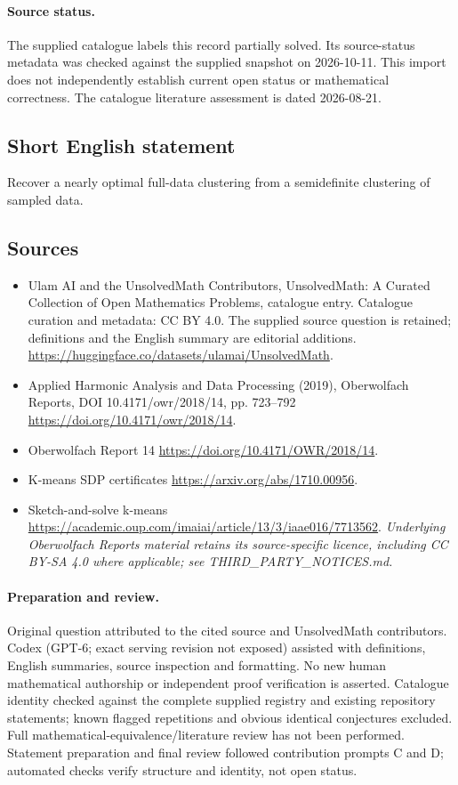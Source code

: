 \documentclass[11pt]{article}
\begin{document}
\paragraph{Source status.}
The supplied catalogue labels this record partially solved. Its source-status metadata was checked against the supplied snapshot on 2026-10-11. This import does not independently establish current open status or mathematical correctness. The catalogue literature assessment is dated 2026-08-21.
\subsection{Short English statement}
Recover a nearly optimal full-data clustering from a semidefinite clustering of sampled data.
\subsection{Sources}
\begin{itemize}
\item[S1] Ulam AI and the UnsolvedMath Contributors, UnsolvedMath: A Curated Collection of Open Mathematics Problems, catalogue entry. Catalogue curation and metadata: CC BY 4.0. The supplied source question is retained; definitions and the English summary are editorial additions.
\url{https://huggingface.co/datasets/ulamai/UnsolvedMath}.
\item[S2] Applied Harmonic Analysis and Data Processing (2019), Oberwolfach Reports, DOI 10.4171/owr/2018/14, pp. 723--792
\url{https://doi.org/10.4171/owr/2018/14}.
\item[S3] Oberwolfach Report 14
\url{https://doi.org/10.4171/OWR/2018/14}.
\item[S4] K-means SDP certificates
\url{https://arxiv.org/abs/1710.00956}.
\item[S5] Sketch-and-solve k-means
\url{https://academic.oup.com/imaiai/article/13/3/iaae016/7713562}.
\textit{Underlying Oberwolfach Reports material retains its source-specific licence, including CC BY-SA 4.0 where applicable; see THIRD\_PARTY\_NOTICES.md.}
\end{itemize}
\paragraph{Preparation and review.}
Original question attributed to the cited source and UnsolvedMath contributors. Codex (GPT-6; exact serving revision not exposed) assisted with definitions, English summaries, source inspection and formatting. No new human mathematical authorship or independent proof verification is asserted. Catalogue identity checked against the complete supplied registry and existing repository statements; known flagged repetitions and obvious identical conjectures excluded. Full mathematical-equivalence/literature review has not been performed. Statement preparation and final review followed contribution prompts C and D; automated checks verify structure and identity, not open status.
\label{end:statement}
\end{document}
